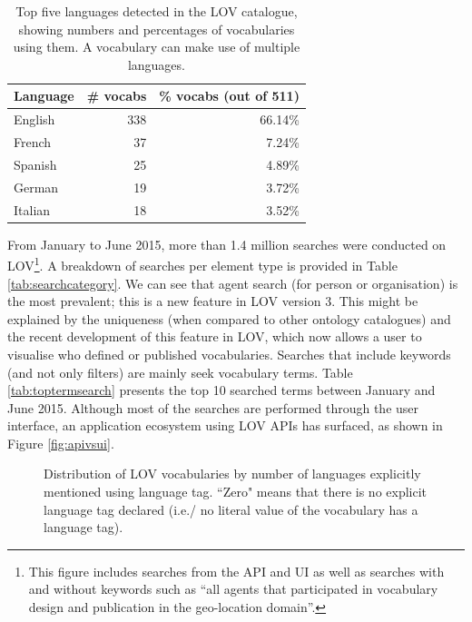 \documentclass{iosart2c}
\begin{document}
 \begin{table}[h!tb]
\caption{Top five languages detected in the LOV catalogue, showing numbers and percentages of vocabularies using them. A vocabulary can make use of multiple languages.}
\begin{tabular}{lrr}
\hline
\textbf{Language} & \textbf{\# vocabs} & \textbf{\% vocabs (out of 511)}  \\ \hline
English & 338 & 66.14\%      \\
French & 37 & 7.24\%      \\
Spanish & 25 & 4.89\%      \\
German & 19 & 3.72\%      \\
Italian & 18 & 3.52\%      \\
\hline  
\end{tabular}
\label{tab:language}
\end{table}


From January to June 2015, more than 1.4 million searches were conducted on LOV\footnote{This figure includes searches from the API and UI as well as searches with and without keywords such as ``all agents that participated in vocabulary design and publication in the geo-location domain''.}. A breakdown of searches per element type is provided in Table \ref{tab:searchcategory}. We can see that agent search (for person or organisation) is the most prevalent; this is a new feature in LOV version 3. This might be explained by the uniqueness (when compared to other ontology catalogues) and the recent development of this feature in LOV, which now allows a user to visualise who defined or published vocabularies. Searches that include keywords (and not only filters) are mainly seek vocabulary terms. Table \ref{tab:toptermsearch} presents the top 10 searched terms between January and June 2015. Although most of the searches are performed through the user interface, an application ecosystem using LOV APIs has surfaced, as shown in Figure \ref{fig:apivsui}. 

\begin{figure}[htb]
\resizebox{\linewidth}{!}{}
\caption{\label{fig:langdist} Distribution of LOV vocabularies by number of languages explicitly mentioned using language tag. ``Zero" means that there is no explicit language tag declared (i.e./ no literal value of the vocabulary has a language tag).}
\end{figure}
\end{document}
